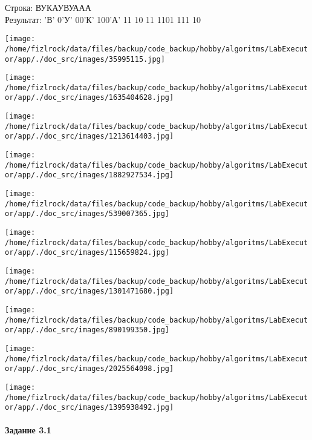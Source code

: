 \documentclass[a4paper, 12pt]{article}
\begin{document}
Строка: 
ВУКАУВУААА\\
Результат: 'В' 0'У' 00'К' 100'А' 11 10 11 1101 111 10

\texttt{[image: /home/fizlrock/data/files/backup/code\_backup/hobby/algoritms/LabExecutor/app/./doc\_src/images/35995115.jpg]}

\texttt{[image: /home/fizlrock/data/files/backup/code\_backup/hobby/algoritms/LabExecutor/app/./doc\_src/images/1635404628.jpg]}

\texttt{[image: /home/fizlrock/data/files/backup/code\_backup/hobby/algoritms/LabExecutor/app/./doc\_src/images/1213614403.jpg]}

\texttt{[image: /home/fizlrock/data/files/backup/code\_backup/hobby/algoritms/LabExecutor/app/./doc\_src/images/1882927534.jpg]}

\texttt{[image: /home/fizlrock/data/files/backup/code\_backup/hobby/algoritms/LabExecutor/app/./doc\_src/images/539007365.jpg]}

\texttt{[image: /home/fizlrock/data/files/backup/code\_backup/hobby/algoritms/LabExecutor/app/./doc\_src/images/115659824.jpg]}

\texttt{[image: /home/fizlrock/data/files/backup/code\_backup/hobby/algoritms/LabExecutor/app/./doc\_src/images/1301471680.jpg]}

\texttt{[image: /home/fizlrock/data/files/backup/code\_backup/hobby/algoritms/LabExecutor/app/./doc\_src/images/890199350.jpg]}

\texttt{[image: /home/fizlrock/data/files/backup/code\_backup/hobby/algoritms/LabExecutor/app/./doc\_src/images/2025564098.jpg]}

\texttt{[image: /home/fizlrock/data/files/backup/code\_backup/hobby/algoritms/LabExecutor/app/./doc\_src/images/1395938492.jpg]}
\pagebreak
\paragraph{Задание 3.1}
\end{document}
